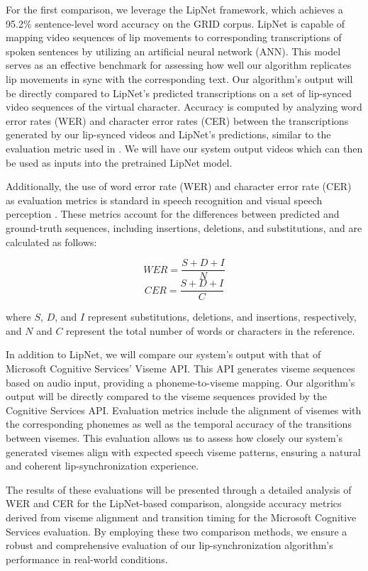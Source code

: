 \documentclass[12pt]{article}
\begin{document}
For the first comparison, we leverage the LipNet framework, which achieves a 95.2\% sentence-level word accuracy on the GRID corpus. LipNet is capable of mapping video sequences of lip movements to corresponding transcriptions of spoken sentences by utilizing an artificial neural network (ANN). This model serves as an effective benchmark for assessing how well our algorithm replicates lip movements in sync with the corresponding text. Our algorithm’s output will be directly compared to LipNet’s predicted transcriptions on a set of lip-synced video sequences of the virtual character. Accuracy is computed by analyzing word error rates (WER) and character error rates (CER) between the transcriptions generated by our lip-synced videos and LipNet’s predictions, similar to the evaluation metric used in \cite{AssaelLIPNET:LIPREADING}.  We will have our system output videos which can then be used as inputs into the pretrained LipNet model.

Additionally, the use of word error rate (WER) and character error rate (CER) as evaluation metrics is standard in speech recognition and visual speech perception \cite{KlakowTestingQ}. These metrics account for the differences between predicted and ground-truth sequences, including insertions, deletions, and substitutions, and are calculated as follows:

\[
WER = \frac{S + D + I}{N}
\]
\[
CER = \frac{S + D + I}{C}
\]

where $S$, $D$, and $I$ represent substitutions, deletions, and insertions, respectively, and $N$ and $C$ represent the total number of words or characters in the reference.

In addition to LipNet, we will compare our system’s output with that of Microsoft Cognitive Services’ Viseme API. This API generates viseme sequences based on audio input, providing a phoneme-to-viseme mapping. Our algorithm’s output will be directly compared to the viseme sequences provided by the Cognitive Services API. Evaluation metrics include the alignment of visemes with the corresponding phonemes as well as the temporal accuracy of the transitions between visemes. This evaluation allows us to assess how closely our system’s generated visemes align with expected speech viseme patterns, ensuring a natural and coherent lip-synchronization experience.

The results of these evaluations will be presented through a detailed analysis of WER and CER for the LipNet-based comparison, alongside accuracy metrics derived from viseme alignment and transition timing for the Microsoft Cognitive Services evaluation. By employing these two comparison methods, we ensure a robust and comprehensive evaluation of our lip-synchronization algorithm’s performance in real-world conditions.
\end{document}
